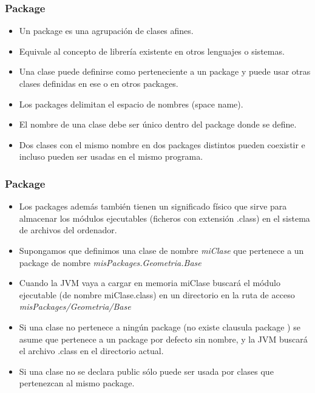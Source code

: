 \documentclass{beamer}
\begin{document}
\begin{frame}
    \frametitle{Package}
    
\begin{itemize}[<+-| alert@+>]
\item Un package es una agrupación de clases afines.
\item Equivale al concepto de librería existente en otros lenguajes o sistemas.
\item Una clase puede definirse como perteneciente a un package y puede usar otras clases definidas en ese o en otros packages.
\item Los packages delimitan el espacio de nombres (space name).
\item El nombre de una clase debe ser único dentro del package donde se define.
\item Dos clases con el mismo nombre en dos packages distintos pueden coexistir e incluso pueden ser usadas en el mismo programa.
\end{itemize}
\pause
\end{frame}

\begin{frame}
    \frametitle{Package}
    
\begin{itemize}[<+-| alert@+>]
\item Los packages además también tienen un significado físico que sirve para almacenar los módulos ejecutables (ficheros con extensión .class) en el sistema de archivos del ordenador. 
\item Supongamos que definimos una clase de nombre \emph{miClase} que pertenece a un package de nombre \emph{misPackages.Geometria.Base}
\item Cuando la JVM vaya a cargar en memoria miClase  buscará el módulo ejecutable (de nombre miClase.class) en un directorio en la ruta de acceso \emph{misPackages/Geometria/Base}
\item Si una clase no pertenece a ningún package (no existe clausula package )  se asume que pertenece a un package por defecto sin nombre, y la JVM buscará el archivo .class en el directorio actual. 
\item Si una clase no se declara public sólo puede ser usada por clases que pertenezcan al mismo package.  
\end{itemize}
\pause
\end{frame}
\end{document}
